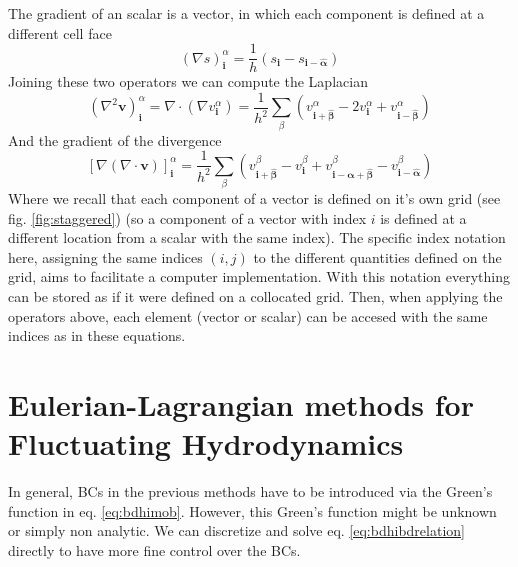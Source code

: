 \documentclass[ twoside,openright,titlepage,numbers=noenddot,%
headinclude,footinclude,cleardoublepage=empty,abstract=on,
BCOR=5mm,paper=a4,fontsize=11pt, dvipsnames
]{scrreprt}
\renewcommand{\vec}[1]{\bm{#1}}
\begin{document}
The gradient of an scalar is a vector, in which each component is defined at a different cell face
\begin{equation}
  \label{eq:staggeredgrad}
  (\nabla s)^\alpha_{\vec{i}} = \frac{1}{h}(s_{\vec{i}} - s_{\vec{i}- \vec{\hat{\alpha}}})
\end{equation}
Joining these two operators we can compute the Laplacian
\begin{equation}
  (\nabla^2\vec{v})^\alpha_{\vec{i}} = \nabla\cdot(\nabla v_{\vec{i}}^\alpha) = \frac{1}{h^2}\sum_\beta\left(v^\alpha_{\vec{i} +\vec{\hat{\beta}}}  - 2v^\alpha_{\vec{i}} + v^\alpha_{\vec{i} -\vec{\hat{\beta}}} \right)
\end{equation}
And the gradient of the divergence
\begin{equation}
  \label{eq:staggeredlap}
\left[\nabla(\nabla\cdot \vec{v})\right]^\alpha_{\vec{i}} = \frac{1}{h^2}\sum_\beta\left(v^\beta_{\vec{i} +\vec{\hat{\beta}}}  - v^\beta_{\vec{i}} + v^\beta_{\vec{i} -\vec{\hat{\alpha}} + \vec{\hat{\beta}}} - v^\beta_{\vec{i} -\vec{\hat{\alpha}}}\right)
\end{equation}
Where we recall that each component of a vector is defined on it's own grid (see fig. \ref{fig:staggered}) (so a component of a vector with index $i$ is defined at a different location from a scalar with the same index). The specific index notation here, assigning the same indices $(i,j)$ to the different quantities defined on the grid, aims to facilitate a computer implementation. With this notation everything can be stored as if it were defined on a collocated grid. Then, when applying the operators above, each element (vector or scalar) can be accesed with the same indices as in these equations.



\chapter{Eulerian-Lagrangian methods for Fluctuating Hydrodynamics}
In general, \gls{BC}s in the previous methods have to be introduced via the Green's function in eq. \eqref{eq:bdhimob}. However, this Green's function might be unknown or simply non analytic. We can discretize and solve eq. \eqref{eq:bdhibdrelation} directly to have more fine control over the \gls{BC}s.
\end{document}
